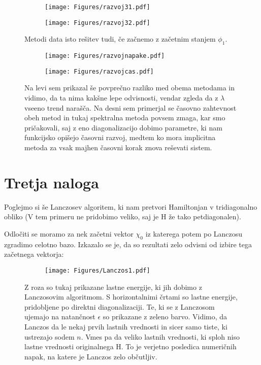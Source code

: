 \documentclass{article}
\begin{document}
\begin{figure}[H]
\centering
\begin{subfigure}{.49\textwidth}
\texttt{[image: Figures/razvoj31.pdf]}
\end{subfigure}
\begin{subfigure}{.49\textwidth}
\texttt{[image: Figures/razvoj32.pdf]}
\end{subfigure}
\caption*{Metodi data isto rešitev tudi, če začnemo z začetnim stanjem $\phi_1$.}
\end{figure}

\begin{figure}[H]
\centering
\begin{subfigure}{.49\textwidth}
\texttt{[image: Figures/razvojnapake.pdf]}
\end{subfigure}
\begin{subfigure}{.49\textwidth}
\texttt{[image: Figures/razvojcas.pdf]}
\end{subfigure}
\caption*{Na levi sem prikazal še povprečno razliko med obema metodama in vidimo, da ta nima kakšne lepe odvisnosti, vendar zgleda da z $\lambda$ vseeno trend narašča. Na desni sem primerjal se časovno zahtevnost obeh metod in tukaj spektralna metoda povsem zmaga, kar smo pričakovali, saj z eno diagonalizacijo dobimo parametre, ki nam funkcijsko opišejo časovni razvoj, medtem ko mora implicitna metoda za vsak majhen časovni korak znova reševati sistem.}
\end{figure}

\section*{Tretja naloga}

Poglejmo si še Lanczosev algoritem, ki nam pretvori Hamiltonjan v tridiagonalno obliko (V tem primeru ne pridobimo veliko, saj je H že tako petdiagonalen).

Odločiti se moramo za nek začetni vektor $\chi_0$ iz katerega potem po Lanczosu zgradimo celotno bazo. Izkazalo se je, da so rezultati zelo odvisni od izbire tega začetnega vektorja:

\begin{figure}[H]
\centering
\begin{subfigure}{.7\textwidth}
\texttt{[image: Figures/Lanczos1.pdf]}
\end{subfigure}
\caption*{Z roza so tukaj prikazane lastne energije, ki jih dobimo z Lanczosovim algoritmom. S horizontalnimi črtami so lastne energije, pridobljene po direktni diagonalizaciji. Te, ki se z Lanczosom ujemajo na natančnost $\epsilon$ so prikazane z zeleno barvo. Vidimo, da Lanczos da le nekaj prvih lastnih vrednosti in sicer samo tiste, ki ustrezajo sodem $n$. Vmes pa da veliko lastnih vrednosti, ki sploh niso lastne vrednosti originalnega H. To je verjetno posledica numeričnih napak, na katere je Lanczos zelo občutljiv.}
\end{figure}
\end{document}
